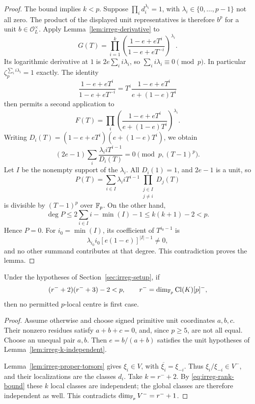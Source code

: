 \begin{proof}
The bound implies \(k<p\). Suppose
\(\prod_i d_i^{\lambda_i}=1\), with
\(\lambda_i\in\{0,\ldots,p-1\}\) not all zero. The product of the
displayed unit representatives is therefore \(b^p\) for a unit
\(b\in\mathcal O_L^\times\). Apply
Lemma~\ref{lem:irreg-derivative} to
\[
 G(T)=\prod_{i=1}^k
 \left(\frac{1-e+eT^i}{1-e+eT^{-i}}\right)^{\lambda_i}.
\]
Its logarithmic derivative at \(1\) is
\(2e\sum_i i\lambda_i\), so \(\sum_i i\lambda_i\equiv0\pmod p\).
In particular \(\zeta_p^{\sum_i i\lambda_i}=1\) exactly. The identity
\[
 \frac{1-e+eT^i}{1-e+eT^{-i}}
   =T^i\frac{1-e+eT^i}{e+(1-e)T^i}
\]
then permits a second application to
\[
 F(T)=\prod_i
 \left(\frac{1-e+eT^i}{e+(1-e)T^i}\right)^{\lambda_i}.
\]
Writing
\(D_i(T)=(1-e+eT^i)(e+(1-e)T^i)\), we obtain
\[
 (2e-1)\sum_i\frac{\lambda_i iT^{i-1}}{D_i(T)}
       =0\pmod{p,(T-1)^p}.
\]
Let \(I\) be the nonempty support of the \(\lambda_i\).
All \(D_i(1)=1\), and \(2e-1\) is a unit, so
\[
 P(T)=
 \sum_{i\in I}\lambda_i iT^{i-1}
       \prod_{\substack{j\in I\\j\neq i}}D_j(T)
\]
is divisible by \((T-1)^p\) over \(\mathbb F_p\). On the other hand,
\[
 \deg P\leq2\sum_{i\in I}i-\min(I)-1
          \leq k(k+1)-2<p.
\]
Hence \(P=0\). For \(i_0=\min(I)\), its coefficient of \(T^{i_0-1}\)
is
\[
 \lambda_{i_0}i_0[e(1-e)]^{|I|-1}\neq0,
\]
and no other summand contributes at that degree. This contradiction
proves the lemma.
\end{proof}

\begin{theorem}\label{thm:irreg-rank}
Under the hypotheses of Section~\ref{sec:irreg-setup}, if
\begin{equation}
 (r^-+2)(r^-+3)-2<p,
 \qquad r^-=\dim_{\mathbb F_p}\operatorname{Cl}(K)[p]^-,
 \label{eq:irreg-rank-bound}
\end{equation}
then no permitted \(p\)-local centre is first case.
\end{theorem}

\begin{proof}
Assume otherwise and choose signed primitive unit coordinates
\(a,b,c\). Their nonzero residues satisfy \(a+b+c=0\), and, since
\(p\geq5\), are not all equal. Choose an unequal pair \(a,b\).
Then \(e=b/(a+b)\) satisfies the unit hypotheses of
Lemma~\ref{lem:irreg-k-independent}.

Lemma~\ref{lem:irreg-proper-torsors} gives
\(\xi_i\in V\), with \(\overline{\xi_i}=\xi_{-i}\). Thus
\(\xi_i/\xi_{-i}\in V^-\), and their localizations are the classes
\(d_i\). Take \(k=r^-+2\). By \eqref{eq:irreg-rank-bound} these \(k\)
local classes are independent; the global classes are therefore
independent as well. This contradicts
\(\dim_{\mathbb F_p}V^-=r^-+1\).
\end{proof}

